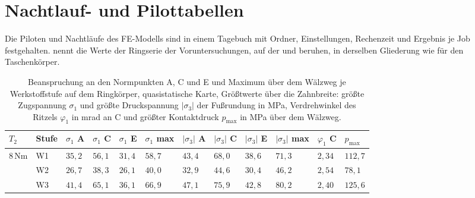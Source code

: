 \section{Nachtlauf- und Pilottabellen}
\label{sec:anhang_f}

Die Piloten und Nachtläufe des FE-Modells sind in einem Tagebuch mit Ordner, Einstellungen, Rechenzeit und Ergebnis je Job festgehalten.  nennt die Werte der Ringserie der Voruntersuchungen, auf der  und  beruhen, in derselben Gliederung wie  für den Taschenkörper.

\begin{table}[htbp]
	\caption{Beanspruchung an den Normpunkten A, C und E und Maximum über dem Wälzweg je Werkstoffstufe auf dem Ringkörper, quasistatische Karte, Größtwerte über die Zahnbreite: größte Zugspannung $\sigma_{\mathrm{1}}$ und größte Druckspannung $|\sigma_{\mathrm{3}}|$ der Fußrundung in MPa, Verdrehwinkel des Ritzels $\varphi_{\mathrm{1}}$ in mrad an C und größter Kontaktdruck $p_{\mathrm{max}}$ in MPa über dem Wälzweg.}
	\label{tab:waelzweg_ring}
	\centering
	\footnotesize
	\setlength{\tabcolsep}{4pt}
	\begin{tabular}{L{1.0cm}L{0.8cm}L{1.0cm}L{1.0cm}L{1.0cm}L{1.1cm}L{1.0cm}L{1.0cm}L{1.0cm}L{1.1cm}L{1.1cm}L{1.1cm}}
		$T_{2}$  & Stufe & $\sigma_{\mathrm{1}}$ A & $\sigma_{\mathrm{1}}$ C & $\sigma_{\mathrm{1}}$ E & $\sigma_{\mathrm{1}}$ max & $|\sigma_{\mathrm{3}}|$ A & $|\sigma_{\mathrm{3}}|$ C & $|\sigma_{\mathrm{3}}|$ E & $|\sigma_{\mathrm{3}}|$ max & $\varphi_{\mathrm{1}}$ C & $p_{\mathrm{max}}$ \\
		\hline
		$8$\,Nm  & W1    & $35{,}2$                & $56{,}1$                & $31{,}4$                & $58{,}7$                  & $43{,}4$                  & $68{,}0$                  & $38{,}6$                  & $71{,}3$                    & $2{,}34$                 & $112{,}7$          \\
		\hline
		         & W2    & $26{,}7$                & $38{,}3$                & $26{,}1$                & $40{,}0$                  & $32{,}9$                  & $44{,}6$                  & $30{,}4$                  & $46{,}2$                    & $2{,}54$                 & $78{,}1$           \\
		\hline
		         & W3    & $41{,}4$                & $65{,}1$                & $36{,}1$                & $66{,}9$                  & $47{,}1$                  & $75{,}9$                  & $42{,}8$                  & $80{,}2$                    & $2{,}40$                 & $125{,}6$          \\

\end{tabular}
\end{table}
